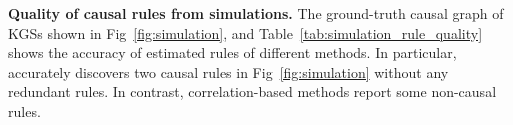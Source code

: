 \noindent
\textbf{Quality of causal rules from simulations.}
The ground-truth causal graph of KGSs shown in Fig~\ref{fig:simulation}, and
Table~\ref{tab:simulation_rule_quality} shows the accuracy of estimated rules of different methods.
In particular, \dname~ accurately discovers two causal rules in Fig~\ref{fig:simulation} without any redundant rules.
In contrast, correlation-based methods report some non-causal rules.


\begin{table}[t]
\caption{Experimental results on simulation data with $p_{X_1}=0.5$, based on the metrics (precision, recall and SHD), which are commonly used to evaluate the estimated causal graph.}
\label{tab:simulation_rule_quality}
\centering
{}
\vspace{-4pt}
\end{table}

